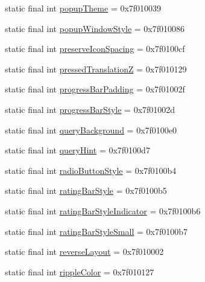 \begin{CompactItemize}
static final int \hyperlink{classandroid_1_1support_1_1v7_1_1cardview_1_1_r_1_1attr_d5c1fe124508a93d40a8fb0c9c1e6c3b}{popupTheme} = 0x7f010039
\item 
static final int \hyperlink{classandroid_1_1support_1_1v7_1_1cardview_1_1_r_1_1attr_a59034a2f4fd69fbe5a44126331ad7fd}{popupWindowStyle} = 0x7f010086
\item 
static final int \hyperlink{classandroid_1_1support_1_1v7_1_1cardview_1_1_r_1_1attr_b2cde2b3a494233ce0af55dcbd1e7a47}{preserveIconSpacing} = 0x7f0100cf
\item 
static final int \hyperlink{classandroid_1_1support_1_1v7_1_1cardview_1_1_r_1_1attr_02472b4da96c2c4e30ffb624460f0956}{pressedTranslationZ} = 0x7f010129
\item 
static final int \hyperlink{classandroid_1_1support_1_1v7_1_1cardview_1_1_r_1_1attr_4bacd53e9d1e3326558372ef604e4e52}{progressBarPadding} = 0x7f01002f
\item 
static final int \hyperlink{classandroid_1_1support_1_1v7_1_1cardview_1_1_r_1_1attr_1fa5d98abe681f9647b609a95891d0ad}{progressBarStyle} = 0x7f01002d
\item 
static final int \hyperlink{classandroid_1_1support_1_1v7_1_1cardview_1_1_r_1_1attr_a60e0289e17d48f4c11297bdd3af996a}{queryBackground} = 0x7f0100e0
\item 
static final int \hyperlink{classandroid_1_1support_1_1v7_1_1cardview_1_1_r_1_1attr_37367d17de3f034f4e3dd0d71e3a8636}{queryHint} = 0x7f0100d7
\item 
static final int \hyperlink{classandroid_1_1support_1_1v7_1_1cardview_1_1_r_1_1attr_a5f87ca34ac1d9176168c35f03eb2db6}{radioButtonStyle} = 0x7f0100b4
\item 
static final int \hyperlink{classandroid_1_1support_1_1v7_1_1cardview_1_1_r_1_1attr_d0bd3f1d2cdb4eba5ec3a83d9814a30c}{ratingBarStyle} = 0x7f0100b5
\item 
static final int \hyperlink{classandroid_1_1support_1_1v7_1_1cardview_1_1_r_1_1attr_2608d946c97132de347cc2e127a612c9}{ratingBarStyleIndicator} = 0x7f0100b6
\item 
static final int \hyperlink{classandroid_1_1support_1_1v7_1_1cardview_1_1_r_1_1attr_4c869584ba5340b0190799cb8e3ca25c}{ratingBarStyleSmall} = 0x7f0100b7
\item 
static final int \hyperlink{classandroid_1_1support_1_1v7_1_1cardview_1_1_r_1_1attr_f4827232ea62f234b16ebe4e05b516b3}{reverseLayout} = 0x7f010002
\item 
static final int \hyperlink{classandroid_1_1support_1_1v7_1_1cardview_1_1_r_1_1attr_05b0ba92e87e0a21e01ff5b25d379da6}{rippleColor} = 0x7f010127

\end{CompactItemize}

